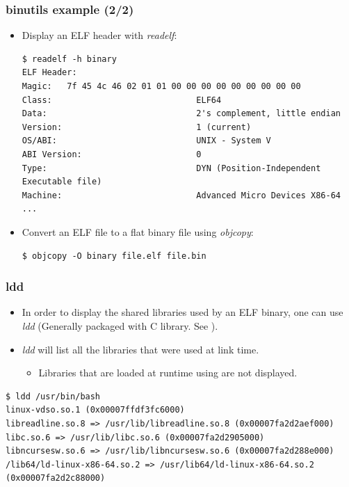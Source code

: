 \begin{frame}[fragile]
  \frametitle{binutils example (2/2)}
  \begin{itemize}
    \item Display an ELF header with {\em readelf}:
    \begin{block}{}
      \begin{verbatim}
$ readelf -h binary
ELF Header:
Magic:   7f 45 4c 46 02 01 01 00 00 00 00 00 00 00 00 00
Class:                             ELF64
Data:                              2's complement, little endian
Version:                           1 (current)
OS/ABI:                            UNIX - System V
ABI Version:                       0
Type:                              DYN (Position-Independent Executable file)
Machine:                           Advanced Micro Devices X86-64
...
      \end{verbatim}
    \end{block}

    \item Convert an ELF file to a flat binary file using {\em objcopy}:
    \begin{block}{}
      \begin{verbatim}
$ objcopy -O binary file.elf file.bin
      \end{verbatim}
    \end{block}
  \end{itemize}
\end{frame}


\begin{frame}[fragile]
  \frametitle{ldd}
  \begin{itemize}
    \item In order to display the shared libraries used by an ELF binary, one
          can use {\em ldd} (Generally packaged with C library. See ).
    \item {\em ldd} will list all the libraries that were used at link time.
    \begin{itemize}
      \item Libraries that are loaded at runtime using  are not
            displayed.
    \end{itemize}
  \end{itemize}
  \begin{block}{}
    \begin{verbatim}
$ ldd /usr/bin/bash
linux-vdso.so.1 (0x00007ffdf3fc6000)
libreadline.so.8 => /usr/lib/libreadline.so.8 (0x00007fa2d2aef000)
libc.so.6 => /usr/lib/libc.so.6 (0x00007fa2d2905000)
libncursesw.so.6 => /usr/lib/libncursesw.so.6 (0x00007fa2d288e000)
/lib64/ld-linux-x86-64.so.2 => /usr/lib64/ld-linux-x86-64.so.2 (0x00007fa2d2c88000)
    \end{verbatim}
  \end{block}
\end{frame}

